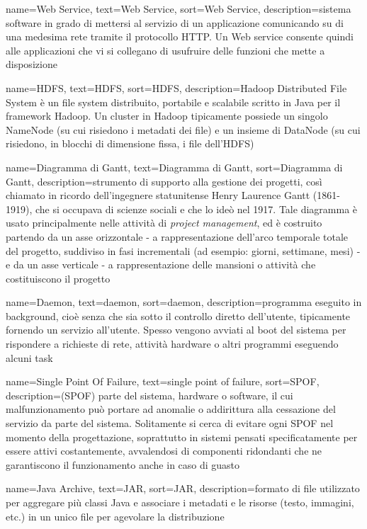 {
	name=Web Service,
	text=Web Service,
	sort=Web Service,
	description={sistema software in grado di mettersi al servizio di un applicazione comunicando su di una medesima rete tramite il protocollo HTTP. Un Web service consente quindi alle applicazioni che vi si collegano di usufruire delle funzioni che mette a disposizione}
}

{
	name=HDFS,
	text=HDFS,
	sort=HDFS,
	description={Hadoop Distributed File System è un file system distribuito, portabile e scalabile scritto in Java per il framework Hadoop. Un cluster in Hadoop tipicamente possiede un singolo NameNode (su cui risiedono i metadati dei file) e un insieme di DataNode (su cui risiedono, in blocchi di dimensione fissa, i file dell'HDFS)}
}

{
	name=Diagramma di Gantt,
	text=Diagramma di Gantt,
	sort=Diagramma di Gantt,
	description={strumento di supporto alla gestione dei progetti, così chiamato in ricordo dell'ingegnere statunitense Henry Laurence Gantt (1861-1919), che si occupava di scienze sociali e che lo ideò nel 1917. Tale diagramma è usato principalmente nelle attività di \textit{project management}, ed è costruito partendo da un asse orizzontale - a rappresentazione dell'arco temporale totale del progetto, suddiviso in fasi incrementali (ad esempio: giorni, settimane, mesi) - e da un asse verticale - a rappresentazione delle mansioni o attività che costituiscono il progetto}
}

{
	name=Daemon,
	text=daemon,
	sort=daemon,
	description={programma eseguito in background, cioè senza che sia sotto il controllo diretto dell'utente, tipicamente fornendo un servizio all'utente. Spesso vengono avviati al boot del sistema per rispondere a richieste di rete, attività hardware o altri programmi eseguendo alcuni task}
}

{
	name=Single Point Of Failure,
	text=single point of failure,
	sort=SPOF,
	description={(SPOF) parte del sistema, hardware o software, il cui malfunzionamento può portare ad anomalie o addirittura alla cessazione del servizio da parte del sistema.
	Solitamente si cerca di evitare ogni SPOF nel momento della progettazione, soprattutto in sistemi pensati specificatamente per essere attivi costantemente, avvalendosi di componenti ridondanti che ne garantiscono il funzionamento anche in caso di guasto}
}

{
	name=Java Archive,
	text=JAR,
	sort=JAR,
	description={formato di file utilizzato per aggregare più classi Java e associare i metadati e le risorse (testo, immagini, etc.) in un unico file per agevolare la distribuzione}
}

